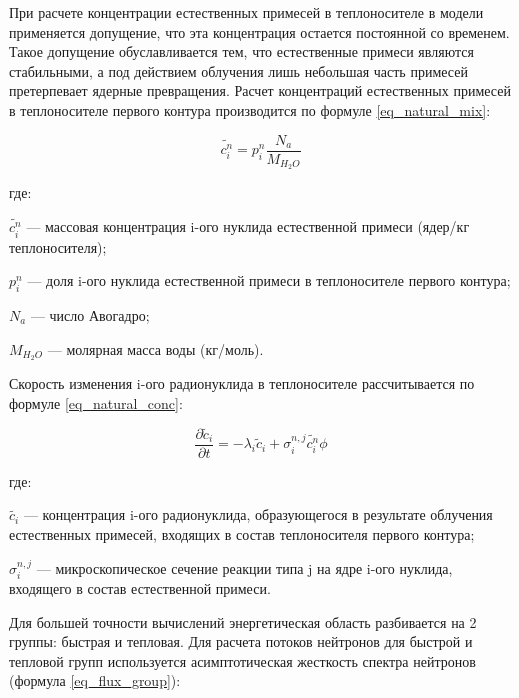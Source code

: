 При расчете концентрации естественных примесей в теплоносителе в модели применяется допущение, что эта концентрация 
остается постоянной со временем. Такое допущение обуславливается тем, что естественные примеси являются стабильными, а 
под действием облучения лишь небольшая часть примесей претерпевает ядерные превращения. Расчет концентраций естественных 
примесей в теплоносителе первого контура производится по формуле \ref{eq_natural_mix}:

\begin{equation}
    \label{eq_natural_mix}
    \widetilde{c_{i}^{n}} = p_{i}^{n} \frac{N_{a}}{M_{H_{2}O}}
\end{equation}

где:
\begin{description}
    \item $\widetilde{c_{i}^{n}}$ --- массовая концентрация i-ого нуклида естественной примеси (ядер/кг теплоносителя);
    \item $p_{i}^{n}$ --- доля i-ого нуклида естественной примеси в теплоносителе первого контура;
    \item $N_{a}$ --- число Авогадро;
    \item $M_{H_{2}O}$ --- молярная масса воды (кг/моль).
\end{description}

Скорость изменения i-ого радионуклида в теплоносителе рассчитывается по формуле \ref{eq_natural_conc}:

\begin{equation}
    \label{eq_natural_conc}
    \frac{\partial \widetilde{c}_{i}}{\partial t} = -\lambda_{i}\widetilde{c}_{i} + \sigma_{i}^{n,j} \widetilde{c_{i}^{n}}
        \phi 
\end{equation}

где:
\begin{description}
    \item $\widetilde{c_{i}}$ --- концентрация i-ого радионуклида, образующегося в результате облучения естественных 
        примесей, входящих в состав теплоносителя первого контура;
    \item $\sigma_{i}^{n,j}$ --- микроскопическое сечение реакции типа j на ядре i-ого нуклида, входящего в состав 
        естественной примеси.
\end{description}

Для большей точности вычислений энергетическая область разбивается на 2 группы: быстрая и тепловая. Для расчета потоков 
нейтронов для быстрой и тепловой групп используется асимптотическая жесткость спектра нейтронов 
(формула \ref{eq_flux_group}):


